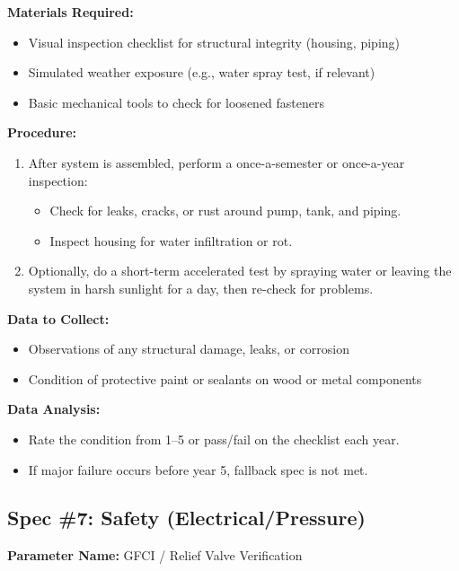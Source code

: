 \documentclass[12pt]{article}
\begin{document}
\noindent
\textbf{Materials Required:}
\begin{itemize}
    \item Visual inspection checklist for structural integrity (housing, piping)
    \item Simulated weather exposure (e.g., water spray test, if relevant)
    \item Basic mechanical tools to check for loosened fasteners
\end{itemize}

\noindent
\textbf{Procedure:}
\begin{enumerate}
    \item After system is assembled, perform a once-a-semester or once-a-year inspection:
        \begin{itemize}
            \item Check for leaks, cracks, or rust around pump, tank, and piping.
            \item Inspect housing for water infiltration or rot.
        \end{itemize}
    \item Optionally, do a short-term accelerated test by spraying water or leaving the system in harsh sunlight for a day, then re-check for problems.
\end{enumerate}

\noindent
\textbf{Data to Collect:}
\begin{itemize}
    \item Observations of any structural damage, leaks, or corrosion
    \item Condition of protective paint or sealants on wood or metal components
\end{itemize}

\noindent
\textbf{Data Analysis:}
\begin{itemize}
    \item Rate the condition from 1--5 or pass/fail on the checklist each year.
    \item If major failure occurs before year 5, fallback spec is not met.
\end{itemize}

\vspace{1em}

\newpage\subsection*{Spec \#7: Safety (Electrical/Pressure)}
\textbf{Parameter Name:} GFCI / Relief Valve Verification
\end{document}
